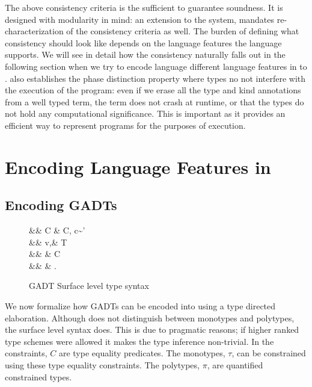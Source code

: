\documentclass[screen,nonacm,manuscript,review]{acmart} %
\begin{document}
The above consistency criteria is the sufficient to guarantee
soundness. It is designed with modularity in mind: an extension to the
system, mandates re-characterization of the consistency criteria as
well. The burden of defining what consistency should look like depends
on the language features the language supports. We will see in detail
how the consistency naturally falls out in the following section when
we try to encode language different language features in to
\SFC.  also establishes the phase distinction
property\cite{harper_higher-order_1989} where types no not
interfere with the execution of the program: even if we erase all the
type and kind annotations from a well typed term, the term does not
crash at runtime, or that the types do not hold any computational
significance. This is important as it provides an efficient way to
represent programs for the purposes of execution.

\section{Encoding Language Features in \SFC}\label{sec:sfc-encoding-features}%
\subsection{Encoding GADTs}\label{sec:fc-encodes-gadts}
\begin{figure}[ht]
 \centering
 \begin{syntax}
  && C \bnfeq& \empt \bnfor C, c\co\tau\sim\tau'\\
  && v,\tau \bnfeq& \TyVar \bnfor \tau\to\tau \bnfor T\App\many\tau\\
  && \eta \bnfeq& \tau \bnfor C \then \eta\\
  && \pi \bnfeq& \eta \bnfor \Forall\TyVar.\pi
 \end{syntax}
 \caption{GADT Surface level type syntax}
 \label{fig:gadt-type-syntax}
\end{figure}

We now formalize how GADTs can be encoded into \SFC
using a type directed elaboration. Although \SFC does not distinguish
between monotypes and polytypes, the surface level syntax does. This
is due to pragmatic reasons; if higher ranked type schemes were allowed
it makes the type inference non-trivial\cite{jones_practical_2007,}.
In the  constraints, $C$ are type equality
predicates. The monotypes, $\tau$, can be constrained using these type
equality constraints. The polytypes, $\pi$, are quantified constrained types.
\end{document}
